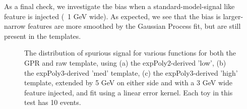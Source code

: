As a final check, we investigate the bias when a standard-model-signal like feature is injected (~1 GeV wide). As expected, we see that the bias is larger- narrow features are more smoothed by the Gaussian Process fit, but are still present in the templates.

\begin{figure} 
\begin{center}

\caption{The distribution of spurious signal for various functions for both the GPR and raw template, using (a) the expPoly2-derived 'low', (b) the expPoly3-derived 'med' template, (c) the expPoly3-derived 'high' template, extended by 5 GeV on either side and with a 3 GeV wide feature injected, and fit using a linear error kernel. Each toy in this test has 10 events.}
\label{fig:linearkernel_lowpt_10_Sig_1s}
\end{center}
\end{figure}

